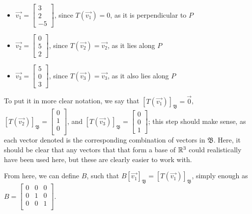 \documentclass[12pt]{article}
\begin{document}
\begin{itemize}
    \item $\vec{v_1} = \begin{bmatrix}
        3\\
        2\\
        -5
    \end{bmatrix}$, since $T(\vec{v_1}) = 0$, as it is perpendicular to $P$

    \item $\vec{v_2} = \begin{bmatrix}
        0\\
        5\\
        2
    \end{bmatrix}$, since $T(\vec{v_2}) = \vec{v_2}$, as it lies along $P$

    \item $\vec{v_3} = \begin{bmatrix}
        5\\
        0\\
        3
    \end{bmatrix}$, since $T(\vec{v_3}) = \vec{v_3}$, as it also lies along $P$
\end{itemize}

To put it in more clear notation, we say that $[T(\vec{v_1})]_{\mathfrak{B}} = \vec{0}$, $[T(\vec{v_2})]_{\mathfrak{B}} = \begin{bmatrix}
0\\
1\\
0\\\end{bmatrix}$, and $[T(\vec{v_3})]_{\mathfrak{B}} = \begin{bmatrix}
    0\\
    0\\
    1\end{bmatrix}$; this step should make sense, as each vector denoted is the corresponding combination of vectors in $\mathfrak{B}$. Here, it should be clear that any vectors that that form a base of $\mathbb{R}^{3}$ could realistically have been used here, but these are clearly easier to work with.

    From here, we can define $B$, such that $B[\vec{v_1}]_{\mathfrak{B}} = [T(\vec{v_1})]_{\mathfrak{B}}$, simply enough as $B = \begin{bmatrix}
        0 & 0 & 0\\
        0 & 1 & 0\\
        0 & 0 & 1\\
    \end{bmatrix}$.
\end{document}
